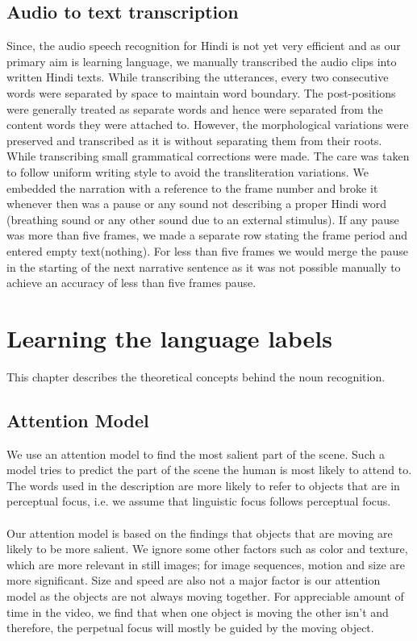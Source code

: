 \documentclass[12pt, a4paper]{report}
\begin{document}
\section{Audio to text transcription}

Since, the audio speech recognition for Hindi is not yet very efficient and as our primary aim is learning language, we manually transcribed the audio clips into written Hindi texts. While transcribing the utterances, every two consecutive words were separated by space to maintain word boundary. The post-positions were generally treated as separate words and hence were separated from the content words they were attached to. However, the morphological variations were preserved and transcribed as it is without separating them from their roots. While transcribing small grammatical corrections were made. The care was taken to follow uniform writing style to avoid the transliteration variations. We embedded the narration with a reference to the frame number and broke it whenever then was a pause or any sound not describing a proper Hindi word (breathing sound or any other sound due to an external stimulus). If any pause was more than five frames, we made a separate row stating the frame period and entered empty text(nothing). For less than five frames we would merge the pause in the starting of the next narrative sentence as it was not possible manually to achieve an accuracy of less than five frames pause.

\chapter{Learning the language labels}
This chapter describes the theoretical concepts behind the noun recognition.
\section{Attention Model}
We use an attention model to find the most salient part of the scene. Such a model tries to predict the part of the scene the human is most likely to attend to. The words used in the description are more likely to refer to objects that are in perceptual focus, i.e. we assume that linguistic focus follows perceptual focus.\\
\\
Our attention model is based on the findings that objects that are moving are likely to be more salient. We ignore some other factors such as color and texture, which are more relevant in still images; for image sequences, motion and size are more significant. Size and speed are also not a major factor is our attention model as the objects are not always moving together. For appreciable amount of time in the video, we find that when one object is moving the other isn’t and therefore, the perpetual focus will mostly be guided by the moving object.
\end{document}
